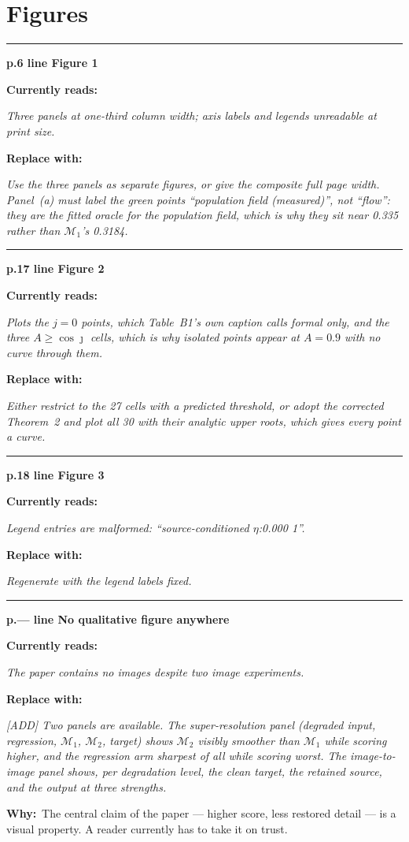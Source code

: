 \documentclass[11pt]{article}
\newcommand{\M}{\mathcal M}
\newcommand{\LOC}[2]{\medskip\noindent\textcolor{hd}{\rule{\textwidth}{0.6pt}}\par
  \noindent\textbf{\large p.#1 \quad line #2}\par\smallskip}
\newcommand{\WRONG}[1]{\noindent\textcolor{bad}{\textbf{Currently reads:}}\par
  \noindent\begingroup\itshape #1\endgroup\par\smallskip}
\newcommand{\RIGHT}[1]{\noindent\textcolor{good}{\textbf{Replace with:}}\par
  \noindent\begingroup\itshape #1\endgroup\par\smallskip}
\newcommand{\WHY}[1]{\noindent\textbf{Why:}\ #1\par}
\begin{document}
\section*{Figures}

\LOC{6}{Figure 1}
\WRONG{Three panels at one-third column width; axis labels and legends unreadable at print size.}
\RIGHT{Use the three panels as separate figures, or give the composite full page width. Panel~(a)
must label the green points ``population field (measured)'', not ``flow'': they are the fitted
oracle for the population field, which is why they sit near 0.335 rather than $\M_1$'s 0.3184.}

\LOC{17}{Figure 2}
\WRONG{Plots the $j=0$ points, which Table~B1's own caption calls formal only, and the three
$A\ge\cos\jmath$ cells, which is why isolated points appear at $A=0.9$ with no curve through
them.}
\RIGHT{Either restrict to the 27 cells with a predicted threshold, or adopt the corrected
Theorem~2 and plot all 30 with their analytic upper roots, which gives every point a curve.}

\LOC{18}{Figure 3}
\WRONG{Legend entries are malformed: ``source-conditioned $\eta$:0.000 1''.}
\RIGHT{Regenerate with the legend labels fixed.}

\LOC{---}{No qualitative figure anywhere}
\WRONG{The paper contains no images despite two image experiments.}
\RIGHT{[ADD] Two panels are available. The super-resolution panel (degraded input, regression,
$\M_1$, $\M_2$, target) shows $\M_2$ visibly smoother than $\M_1$ while scoring higher, and the
regression arm sharpest of all while scoring worst. The image-to-image panel shows, per
degradation level, the clean target, the retained source, and the output at three strengths.}
\WHY{The central claim of the paper --- higher score, less restored detail --- is a visual
property. A reader currently has to take it on trust.}
\end{document}

